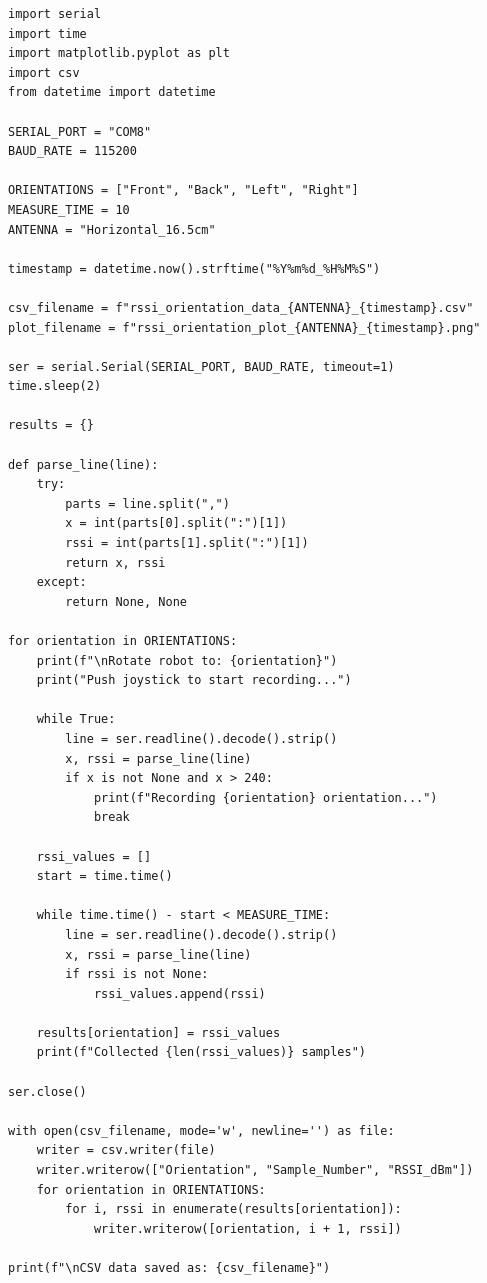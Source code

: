\begin{lstlisting}[style=appendix-py, caption={RSSI vs.\ antenna orientation}, label={lst:orientation}]
import serial
import time
import matplotlib.pyplot as plt
import csv
from datetime import datetime

SERIAL_PORT = "COM8"
BAUD_RATE = 115200

ORIENTATIONS = ["Front", "Back", "Left", "Right"]
MEASURE_TIME = 10
ANTENNA = "Horizontal_16.5cm"

timestamp = datetime.now().strftime("%Y%m%d_%H%M%S")

csv_filename = f"rssi_orientation_data_{ANTENNA}_{timestamp}.csv"
plot_filename = f"rssi_orientation_plot_{ANTENNA}_{timestamp}.png"

ser = serial.Serial(SERIAL_PORT, BAUD_RATE, timeout=1)
time.sleep(2)

results = {}

def parse_line(line):
    try:
        parts = line.split(",")
        x = int(parts[0].split(":")[1])
        rssi = int(parts[1].split(":")[1])
        return x, rssi
    except:
        return None, None

for orientation in ORIENTATIONS:
    print(f"\nRotate robot to: {orientation}")
    print("Push joystick to start recording...")

    while True:
        line = ser.readline().decode().strip()
        x, rssi = parse_line(line)
        if x is not None and x > 240:
            print(f"Recording {orientation} orientation...")
            break

    rssi_values = []
    start = time.time()

    while time.time() - start < MEASURE_TIME:
        line = ser.readline().decode().strip()
        x, rssi = parse_line(line)
        if rssi is not None:
            rssi_values.append(rssi)

    results[orientation] = rssi_values
    print(f"Collected {len(rssi_values)} samples")

ser.close()

with open(csv_filename, mode='w', newline='') as file:
    writer = csv.writer(file)
    writer.writerow(["Orientation", "Sample_Number", "RSSI_dBm"])
    for orientation in ORIENTATIONS:
        for i, rssi in enumerate(results[orientation]):
            writer.writerow([orientation, i + 1, rssi])

print(f"\nCSV data saved as: {csv_filename}")


\end{lstlisting}
